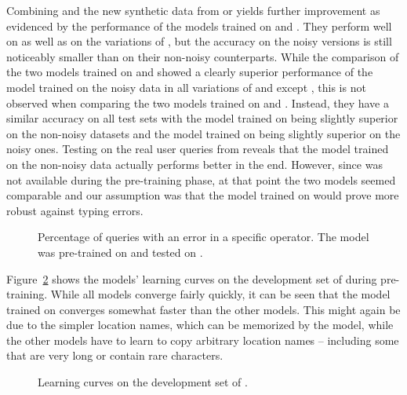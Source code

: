 Combining \nlmtwoone{} and the new synthetic data from \nlmthreea{} or
\nlmthreeb{} yields further improvement as evidenced by the performance of the
models trained on \nlmthreenormal{} and \nlmthree{}. They perform well on
\nlmtwoone{} as well as on the variations of \nlmthree{}, but the accuracy on
the noisy versions is still noticeably smaller than on their non-noisy
counterparts. While the comparison of the two models trained on \nlmthreea{} and
\nlmthreeb{} showed a clearly superior performance of the model trained on the
noisy data in all variations of \nlmtwo{} and \nlmthree{} except \nlmthreea{},
this is not observed when comparing the two models trained on \nlmthreenormal{}
and \nlmthree{}. Instead, they have a similar accuracy on all test sets with the
model trained on \nlmthreenormal{} being slightly superior on the non-noisy
datasets and the model trained on \nlmthree{} being slightly superior on the
noisy ones. Testing on the real user queries from \nlmfour{} reveals that the
model trained on the non-noisy data actually performs better in the end.
However, since \nlmfour{} was not available during the pre-training phase, at
that point the two models seemed comparable and our assumption was that the
model trained on \nlmthreeb{} would prove more robust against typing errors.

\begin{figure}[h]
  \centering
  \resizebox{\textwidth}{!}{}
  \caption[Errors pre-trained on \nlmtwoone{}]{Percentage of queries with an
    error in a specific operator. The model was pre-trained on \nlmapsthree{}
    and tested on \nlmapsfour{}.}
  \label{fig:v3-errors}
\end{figure}

Figure~\ref{fig:pre-trained-learning-curve} shows the models’ learning curves on
the development set of \nlmthree{} during pre-training. While all models
converge fairly quickly, it can be seen that the model trained on \nlmtwoone{}
converges somewhat faster than the other models. This might again be due to the
simpler location names, which can be memorized by the model, while the other
models have to learn to copy arbitrary location names – including some that are
very long or contain rare characters.

\begin{figure}[h]
  \centering
  \resizebox{\textwidth}{!}{}
  \caption[Pre-training learning curves]{Learning curves on the development set
    of \nlmapsthree{}.}
  \label{fig:pre-trained-learning-curve}
\end{figure}

